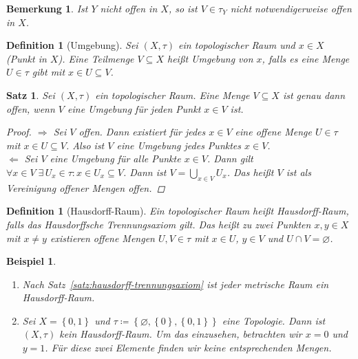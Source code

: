 \documentclass[11pt, twoside, a4paper]{article}
\theoremstyle{plain}
\newtheorem{bemerkung}[blockelement]{Bemerkung}
\newtheorem{definition}[blockelement]{Definition}
\newtheorem{satz}[blockelement]{Satz}
\newtheorem{beispiel}[blockelement]{Beispiel}
\numberwithin{equation}{subsection}
\newcommand{\set}[1]{\left\{#1\right\}}
\newcommand{\pair}[1]{\left(#1\right)}
\newcommand{\impl}[0]{\Rightarrow{}}
\renewcommand{\emptyset}{\varnothing}
\newcommand{\ex}{\;\exists\,}
\newcommand{\anf}[1]{\glqq{}#1\grqq}
\newcommand{\theoremescape}{\leavevmode}
\begin{document}
    \begin{bemerkung}
        Ist $Y$ nicht offen in $X$, so ist $V\in \tau_Y$ nicht notwendigerweise offen in $X$.
    \end{bemerkung}

    \begin{definition}[Umgebung]
        Sei $\pair{X, \tau}$ ein topologischer Raum und $x\in X$ (Punkt in $X$). Eine Teilmenge $V\subseteq X$ heißt Umgebung von $x$, falls es eine Menge $U\in\tau$ gibt mit $x\in U \subseteq V$.
    \end{definition}

    \begin{satz} %
        Sei $\pair{X, \tau}$ ein topologischer Raum. Eine Menge $V\subseteq X$ ist genau dann offen, wenn $V$ eine Umgebung für jeden Punkt $x\in V$ ist.
        \begin{proof}
            \anf{$\impl$} Sei $V$ offen. Dann existiert für jedes $x\in V$ eine offene Menge $U\in\tau$ mit $x\in U\subseteq V$. Also ist $V$ eine Umgebung jedes Punktes $x\in V$.\\[.5\baselineskip]
            \anf{$\Leftarrow$} Sei $V$ eine Umgebung für alle Punkte $x\in V$. Dann gilt $\forall x\in V\ex U_x \in \tau\colon x\in U_x \subseteq V$. Dann ist $V=\bigcup_{x\in V} U_x$. Das heißt $V$ ist als Vereinigung offener Mengen offen.
        \end{proof}
    \end{satz}

    \begin{definition}[Hausdorff-Raum]
        Ein topologischer Raum heißt Hausdorff-Raum, falls das Hausdorffsche Trennungsaxiom gilt. Das heißt zu zwei Punkten $x,y\in X$ mit $x\neq y$ existieren offene Mengen $U,V\in\tau$ mit $x\in U$, $y\in V$ und $U\cap V = \emptyset$.
    \end{definition}

    \begin{beispiel}
        \theoremescape
        \begin{enumerate}
            \item Nach Satz~\ref{satz:hausdorff-trennungsaxiom} ist jeder metrische Raum ein Hausdorff-Raum.
            \item Sei $X=\set{0, 1}$ und $\tau\coloneqq \set{\emptyset, \set{0}, \set{0, 1}}$ eine Topologie. Dann ist $\pair{X, \tau}$ kein Hausdorff-Raum. Um das einzusehen, betrachten wir $x=0$ und $y=1$. Für diese zwei Elemente finden wir keine entsprechenden Mengen.
        \end{enumerate}
    \end{beispiel}
\end{document}
